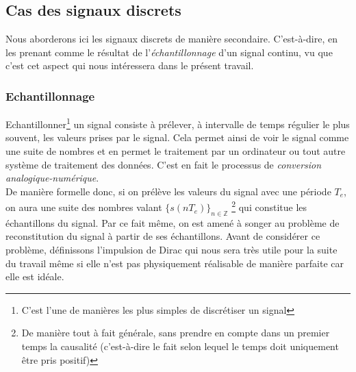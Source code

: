 \subsection{Cas des signaux discrets}
Nous aborderons ici les signaux discrets de manière secondaire. C'est-à-dire, en les prenant comme le résultat de l'\emph{échantillonnage} d'un signal continu, vu que c'est cet aspect qui nous intéressera dans le présent travail.
\subsubsection{Echantillonnage}
Echantillonner\footnote{C'est l'une de manières les plus simples de discrétiser un signal} un signal consiste à prélever, à intervalle de temps régulier le plus souvent, les valeurs prises par le signal. Cela permet ainsi de voir le signal comme une suite de nombres et en permet le traitement par un ordinateur ou tout autre système de traitement des données. C'est en fait le processus de \emph{conversion analogique-numérique}.\\
De manière formelle donc, si on prélève les valeurs du signal avec une période $ T_{e} $, on aura une suite des nombres valant $ \{ s(nT_{e}) \}_{n \in \mathbb{Z}} $ \footnote{De manière tout à fait générale, sans prendre en compte dans un premier temps la causalité (c'est-à-dire le fait selon lequel le temps doit uniquement être pris positif)} qui constitue les échantillons du signal. Par ce fait même, on est amené à songer au problème de reconstitution du signal à partir de ses échantillons. Avant de considérer ce problème, définissons l'impulsion de Dirac qui nous sera très utile pour la suite du travail même si elle n'est pas physiquement réalisable de manière parfaite car elle est idéale.
